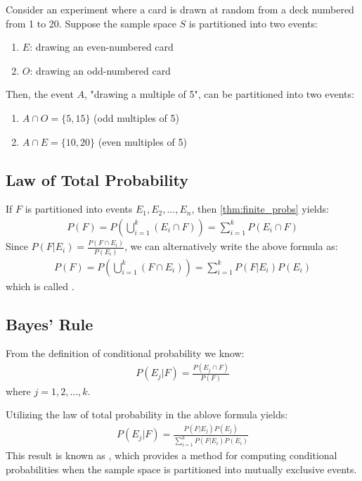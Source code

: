 \begin{exmp}
	Consider an experiment where a card is drawn at random from a deck numbered from 1 to 20.
	Suppose the sample space \( S \) is partitioned into two events:
	\begin{enumerate}
		\item \( E \): drawing an even-numbered card
		\item \( O \): drawing an odd-numbered card
	\end{enumerate}
	Then, the event \( A \), "drawing a multiple of 5", can be partitioned into two events:
	\begin{enumerate}
		\item \( A \cap O = \{ 5, 15 \} \) (odd multiples of 5)
		\item \( A \cap E = \{ 10, 20 \} \) (even multiples of 5)
	\end{enumerate}
\end{exmp}

\subsection{Law of Total Probability}

If \( F \) is partitioned into events \( E_1, E_2, \ldots, E_n \), then \autoref{thm:finite_probs} yields:
\begin{gather*}
	P(F) = P(\bigcup_{i = 1}^{k} (E_i \cap F)) = \sum_{i = 1}^{k} P(E_i \cap F)
\end{gather*}
Since \( P(F | E_i) = \frac{P(F \cap E_i)}{P(E_i)} \), we can alternatively write the above formula as:
\begin{gather*}
	P(F) = P(\bigcup_{i = 1}^{k} (F \cap E_i)) = \sum_{i = 1}^{k} P(F | E_i)P(E_i)
\end{gather*}
which is called .

\subsection{Bayes' Rule}

From the definition of conditional probability we know:
\begin{gather*}
	P(E_j | F) = \frac{P(E_j \cap F)}{P(F)}
\end{gather*}
where \( j = 1, 2, \ldots, k \).

Utilizing the law of total probability in the ablove formula yields:
\begin{gather*}
	P(E_j | F) = \frac{P(F | E_j)P(E_j)}{\sum_{i = 1}^{k}P(F | E_i)P(E_i)}
\end{gather*}
This result is known as ,
which provides a method for computing conditional probabilities when the sample space is partitioned into mutually exclusive events.

